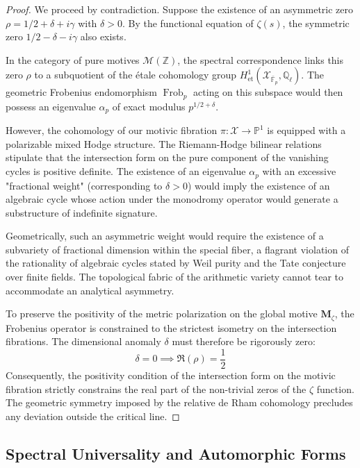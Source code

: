 \documentclass[
]{article}
\begin{document}
\begin{proof}
We proceed by contradiction. Suppose the existence of an asymmetric zero $\rho = 1/2 + \delta + i\gamma$ with $\delta > 0$. By the functional equation of $\zeta(s)$, the symmetric zero $1/2 - \delta - i\gamma$ also exists.

In the category of pure motives $\mathcal{M}(\mathbb{Z})$, the spectral correspondence links this zero $\rho$ to a subquotient of the étale cohomology group $H^1_{\text{et}}(\mathcal{X}_{\bar{\mathbb{F}}_p}, \mathbb{Q}_{\ell})$. The geometric Frobenius endomorphism $\operatorname{Frob}_p$ acting on this subspace would then possess an eigenvalue $\alpha_p$ of exact modulus $p^{1/2 + \delta}$.

However, the cohomology of our motivic fibration $\pi : \mathcal{X} \to \mathbb{P}^1$ is equipped with a polarizable mixed Hodge structure. The Riemann-Hodge bilinear relations stipulate that the intersection form on the pure component of the vanishing cycles is positive definite. The existence of an eigenvalue $\alpha_p$ with an excessive "fractional weight" (corresponding to $\delta > 0$) would imply the existence of an algebraic cycle whose action under the monodromy operator would generate a substructure of indefinite signature.

Geometrically, such an asymmetric weight would require the existence of a subvariety of fractional dimension within the special fiber, a flagrant violation of the rationality of algebraic cycles stated by Weil purity and the Tate conjecture over finite fields. The topological fabric of the arithmetic variety cannot tear to accommodate an analytical asymmetry.

To preserve the positivity of the metric polarization on the global motive $\mathbf{M}_{\zeta}$, the Frobenius operator is constrained to the strictest isometry on the intersection fibrations. The dimensional anomaly $\delta$ must therefore be rigorously zero:
\begin{equation*}
\delta = 0 \implies \Re(\rho) = \frac{1}{2}
\end{equation*}
Consequently, the positivity condition of the intersection form on the motivic fibration strictly constrains the real part of the non-trivial zeros of the $\zeta$ function. The geometric symmetry imposed by the relative de Rham cohomology precludes any deviation outside the critical line.
\end{proof}

\subsection{Spectral Universality and Automorphic Forms}
\end{document}
